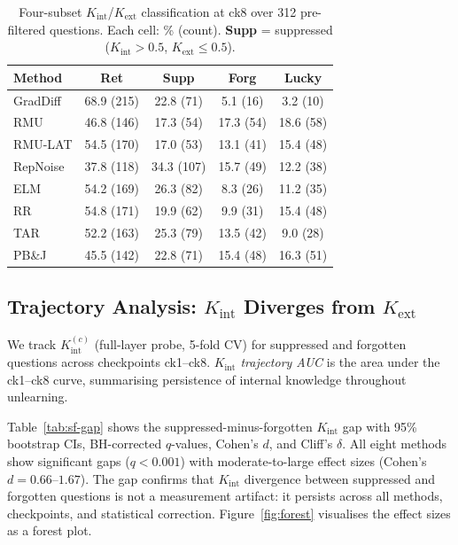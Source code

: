 \documentclass[11pt]{article}
\begin{document}
\begin{table}[t]
\centering
\caption{Four-subset $K_\text{int}$/$K_\text{ext}$ classification at ck8 over
312 pre-filtered questions. Each cell: \% (count).
\textbf{Supp} = suppressed ($K_\text{int}{>}0.5$, $K_\text{ext}{\leq}0.5$).}
\label{tab:subsets}
\small
\setlength{\tabcolsep}{4pt}
\begin{tabular}{lcccc}
\toprule
\textbf{Method} & \textbf{Ret} & \textbf{Supp} & \textbf{Forg} & \textbf{Lucky} \\
\midrule
GradDiff  & 68.9 (215) & 22.8 (71)  &  5.1 (16) &  3.2 (10) \\
RMU       & 46.8 (146) & 17.3 (54)  & 17.3 (54) & 18.6 (58) \\
RMU-LAT   & 54.5 (170) & 17.0 (53)  & 13.1 (41) & 15.4 (48) \\
RepNoise  & 37.8 (118) & 34.3 (107) & 15.7 (49) & 12.2 (38) \\
ELM       & 54.2 (169) & 26.3 (82)  &  8.3 (26) & 11.2 (35) \\
RR        & 54.8 (171) & 19.9 (62)  &  9.9 (31) & 15.4 (48) \\
TAR       & 52.2 (163) & 25.3 (79)  & 13.5 (42) &  9.0 (28) \\
PB\&J     & 45.5 (142) & 22.8 (71)  & 15.4 (48) & 16.3 (51) \\
\bottomrule
\end{tabular}
\end{table}

\subsection{Trajectory Analysis: $K_\text{int}$ Diverges from $K_\text{ext}$}
\label{sec:trajectory}

We track $K_\text{int}^{(c)}$ (full-layer probe, 5-fold CV) for suppressed
and forgotten questions across checkpoints ck1--ck8.
\emph{$K_\text{int}$ trajectory AUC} is the area under the ck1--ck8
curve, summarising persistence of internal knowledge throughout unlearning.

Table~\ref{tab:sf-gap} shows the suppressed-minus-forgotten $K_\text{int}$ gap
with 95\% bootstrap CIs, BH-corrected $q$-values, Cohen's $d$, and Cliff's
$\delta$.
All eight methods show significant gaps ($q < 0.001$) with moderate-to-large
effect sizes (Cohen's $d = 0.66$--$1.67$).
The gap confirms that $K_\text{int}$ divergence between suppressed and forgotten
questions is not a measurement artifact: it persists across all methods,
checkpoints, and statistical correction.
Figure~\ref{fig:forest} visualises the effect sizes as a forest plot.
\end{document}

